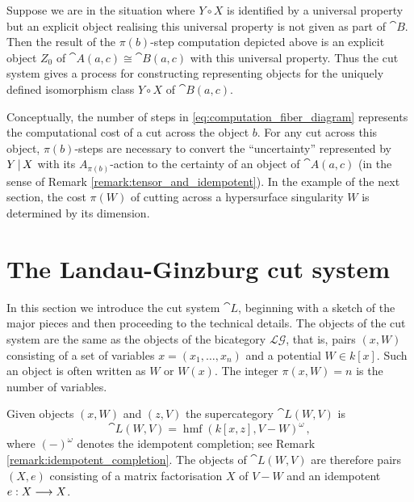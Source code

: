 \documentclass[english,letter paper,12pt,leqno]{article}
\theoremstyle{example}
\numberwithin{equation}{section}
\def\LG{\mathcal{LG}}
\DeclareMathOperator{\hmf}{hmf}
\begin{document}
Suppose we are in the situation where $Y \circ X$ is identified by a universal property but an explicit object realising this universal property is not given as part of $\cat{B}$. Then the result of the $\pi(b)$-step computation depicted above is an explicit object $Z_0$ of $\cat{A}(a,c) \cong \cat{B}(a,c)$ with this universal property. Thus the cut system gives a process for constructing representing objects for the uniquely defined isomorphism class $Y \circ X$ of $\cat{B}(a,c)$.

Conceptually, the number of steps in \eqref{eq:computation_fiber_diagram} represents the computational cost of a cut across the object $b$. For any cut across this object, $\pi(b)$-steps are necessary to convert the ``uncertainty'' represented by $Y \,|\, X$ with its $A_{\pi(b)}$-action to the certainty of an object of $\cat{A}(a,c)$ (in the sense of Remark \ref{remark:tensor_and_idempotent}). In the example of the next section, the cost $\pi(W)$ of cutting across a hypersurface singularity $W$ is determined by its dimension.

\section{The Landau-Ginzburg cut system}\label{section:lg_cut_system}

In this section we introduce the cut system $\cat{L}$, beginning with a sketch of the major pieces and then proceeding to the technical details. The objects of the cut system are the same as the objects of the bicategory $\LG$, that is, pairs $(x, W)$ consisting of a set of variables $x = (x_1,\ldots,x_n)$ and a potential $W \in k[x]$. Such an object is often written as $W$ or $W(x)$. The integer $\pi(x,W) = n$ is the number of variables.

Given objects $(x,W)$ and $(z,V)$ the supercategory $\cat{L}(W, V)$ is
\[
\cat{L}(W,V) = \hmf( k[x,z], V - W )^{\omega}\,,
\]
where $(-)^\omega$ denotes the idempotent completion; see Remark \ref{remark:idempotent_completion}. The objects of $\cat{L}(W,V)$ are therefore pairs $(X,e)$ consisting of a matrix factorisation $X$ of $V - W$ and an idempotent $e: X \longrightarrow X$.
\end{document}
